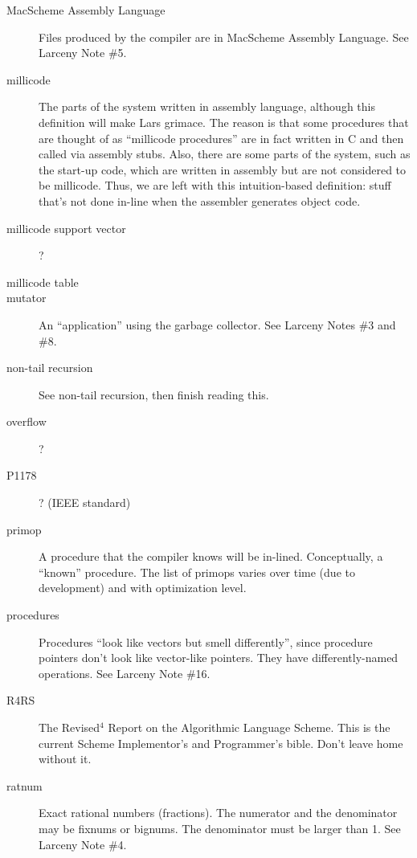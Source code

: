 \begin{description}
\item[MacScheme Assembly Language]
Files produced by the compiler are in MacScheme Assembly Language.
See Larceny Note \#5.

\item[millicode]
The parts of the system written in assembly language, although this 
definition will make Lars grimace.  The reason is that some procedures
that are thought of as ``millicode procedures'' are in fact written in
C and then called via assembly stubs.  Also, there are some parts of
the system, such as the start-up code, which are written in assembly
but are not considered to be millicode.  Thus, we are left with this
intuition-based definition: stuff that's not done in-line when the 
assembler generates object code.

\item[millicode support vector]
?

\item[millicode table]

\item[mutator]
An ``application'' using the garbage collector.
See Larceny Notes \#3 and \#8.

\item[non-tail recursion]  
See non-tail recursion, then finish reading this.

\item[overflow]
?

\item[P1178]
? (IEEE standard)

\item[primop]
A procedure that the compiler knows will be in-lined.  Conceptually, 
a ``known'' procedure.  The list of primops varies over time (due to
development) and with optimization level.

\item[procedures]
Procedures ``look like vectors but smell differently'', since procedure
pointers don't look like vector-like pointers.  They have 
differently-named operations.  
See Larceny Note \#16.

\item[R4RS]
The Revised$^4$ Report on the Algorithmic Language Scheme.  This is
the current Scheme Implementor's and Programmer's bible.  Don't leave
home without it.

\item[ratnum]
Exact rational numbers (fractions).  The numerator and the denominator
may be fixnums or bignums.  The denominator must be larger than 1.
See Larceny Note \#4.


\end{description}
